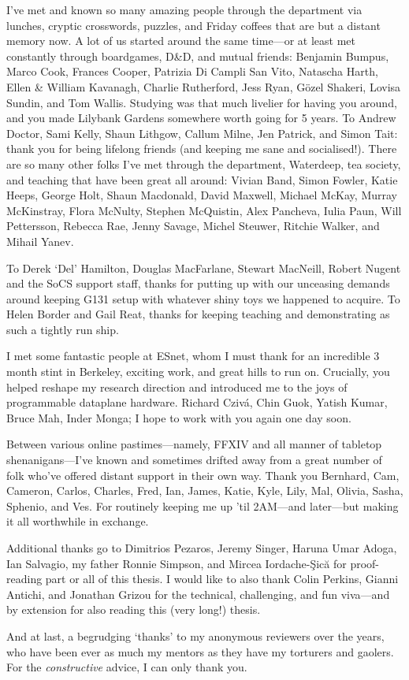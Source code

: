 I've met and known so many amazing people through the department via lunches, cryptic crosswords, puzzles, and Friday coffees that are but a distant memory now.
A lot of us started around the same time---or at least met constantly through boardgames, D\&D, and mutual friends: Benjamin Bumpus, Marco Cook, Frances Cooper, Patrizia Di Campli San Vito, Natascha Harth, Ellen \& William Kavanagh, Charlie Rutherford, Jess Ryan, G\"{o}zel Shakeri, Lovisa Sundin, and Tom Wallis.
Studying was that much livelier for having you around, and you made Lilybank Gardens somewhere worth going for 5 years.
To Andrew Doctor, Sami Kelly, Shaun Lithgow, Callum Milne, Jen Patrick, and Simon Tait: thank you for being lifelong friends (and keeping me sane and socialised!).
There are so many other folks I've met through the department, Waterdeep, tea society, and teaching that have been great all around: Vivian Band, Simon Fowler, Katie Heeps, George Holt, Shaun Macdonald, David Maxwell, Michael McKay, Murray McKinstray, Flora McNulty, Stephen McQuistin, Alex Pancheva, Iulia Paun, Will Pettersson, Rebecca Rae, Jenny Savage, Michel Steuwer, Ritchie Walker, and Mihail Yanev.

To Derek `Del' Hamilton, Douglas MacFarlane, Stewart MacNeill, Robert Nugent and the SoCS support staff, thanks for putting up with our unceasing demands around keeping G131 setup with whatever shiny toys we happened to acquire.
To Helen Border and Gail Reat, thanks for keeping teaching and demonstrating as such a tightly run ship.

I met some fantastic people at ESnet, whom I must thank for an incredible 3 month stint in Berkeley, exciting work, and great hills to run on.
Crucially, you helped reshape my research direction and introduced me to the joys of programmable dataplane hardware.
Richard Cziv\'{a}, Chin Guok, Yatish Kumar, Bruce Mah, Inder Monga; I hope to work with you again one day soon.

Between various online pastimes---namely, FFXIV and all manner of tabletop shenanigans---I've known and sometimes drifted away from a great number of folk who've offered distant support in their own way.
Thank you Bernhard, Cam, Cameron, Carlos, Charles, Fred, Ian, James, Katie, Kyle, Lily, Mal, Olivia, Sasha, Sphenio, and Ves.
For routinely keeping me up 'til 2AM---and later---but making it all worthwhile in exchange.

Additional thanks go to Dimitrios Pezaros, Jeremy Singer, Haruna Umar Adoga, Ian Salvagio, my father Ronnie Simpson, and Mircea Iordache-\c{S}ic\u{a} for proof-reading part or all of this thesis.
I would like to also thank Colin Perkins, Gianni Antichi, and Jonathan Grizou for the technical, challenging, and fun viva---and by extension for also reading this (very long!) thesis.

And at last, a begrudging `thanks' to my anonymous reviewers over the years, who have been ever as much my mentors as they have my torturers and gaolers.
For the \emph{constructive} advice, I can only thank you.
